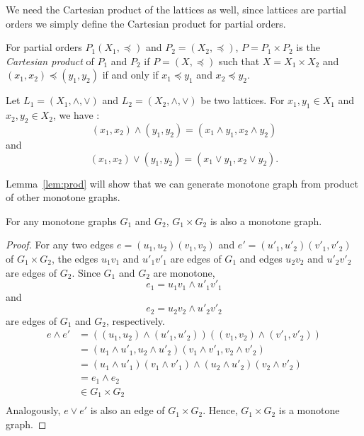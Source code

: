 We need the Cartesian product of the lattices as well,
since lattices are partial orders we simply define the Cartesian product
for partial orders.
\begin{defi} 
For partial orders \(P_1(X_1,\preceq)\) and \(P_2=(X_2,\preceq)\), 
\(P= P_1 \times P_2\) is the \emph{Cartesian product} of \(P_1\) and \(P_2\)
if \(P=(X,\preceq)\) such that \(X=X_1\times X_2\) and \((x_1,x_2) \preceq (y_1,y_2)\)
if and only if \(x_1\preceq y_1\) and \(x_2\preceq y_2\)\@.
\end{defi}

\begin{rem}
Let \(L_1=(X_1,\wedge,\vee)\) and \(L_2=(X_2,\wedge,\vee)\) be two lattices.
For \(x_1,y_1 \in X_1\) and \(x_2,y_2\in X_2\), we have :
\[(x_1,x_2)\wedge (y_1,y_2) = (x_1\wedge y_1, x_2 \wedge y_2) \]
and \[(x_1,x_2)\vee (y_1,y_2) = (x_1\vee y_1, x_2 \vee y_2).\]
\end{rem}

Lemma~\ref{lem:prod} will show that we can generate monotone graph from product of other
monotone graphs.

\begin{lemma}\label{lem:prod}
For any monotone graphs \(G_1\) and \(G_2\), \(G_1 \times G_2\) is also a monotone graph.
\end{lemma}

\begin{proof}
For any two edges \(e = (u_1,u_2)(v_1,v_2)\) and \(e' =(u'_1,u'_2)(v'_1,v'_2)\) of \(G_1\times G_2\),
the edges \(u_1v_1\) and \(u'_1v'_1\) are edges of \(G_1\) and
edges \(u_2v_2\) and \(u'_2v'_2\) are edges of \(G_2\)\@.
Since \(G_1\) and \(G_2\) are monotone,
\[e_1 = u_1v_1 \wedge u'_1v'_1\]
and
\[e_2 = u_2v_2 \wedge u'_2v'_2\]
are edges of \(G_1\) and \(G_2\), respectively.
\begin{align*}
e \wedge e' &= ((u_1,u_2)\wedge(u'_1,u'_2))((v_1,v_2)\wedge(v'_1,v'_2)) \\
&= (u_1\wedge u'_1,u_2 \wedge u'_2)(v_1\wedge v'_1,v_2 \wedge v'_2) \\
&= (u_1\wedge u'_1)(v_1\wedge v'_1) \wedge (u_2\wedge u'_2)(v_2\wedge v'_2) \\
&= e_1 \wedge e_2 \\
&\in G_1 \times G_2 \\
\end{align*}
Analogously, \(e \vee e'\) is also an edge of \(G_1\times G_2\)\@. Hence, \(G_1\times G_2\)
is a monotone graph.
\end{proof}

